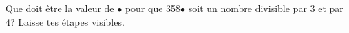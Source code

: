 %
%
	Que doit être la valeur de $\bullet$ pour que 358$\bullet$ soit un nombre divisible par 3 et par 4? Laisse tes étapes visibles.
	\vspace{5cm}
